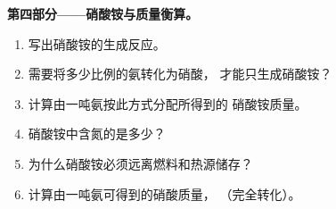 \begin{problem}
\medskip
\noindent\textbf{第四部分——硝酸铵与质量衡算。}
\begin{enumerate}[resume]
  \item 写出硝酸铵的生成反应。
  \item 需要将多少比例的氨转化为硝酸，
        才能只生成硝酸铵？
  \item 计算由一吨氨按此方式分配所得到的
        硝酸铵质量。
  \item 硝酸铵中含氮的是多少？
  \item 为什么硝酸铵必须远离燃料和热源储存？
  \item 计算由一吨氨可得到的硝酸质量，
        （完全转化）。
\end{enumerate}
\end{problem}

